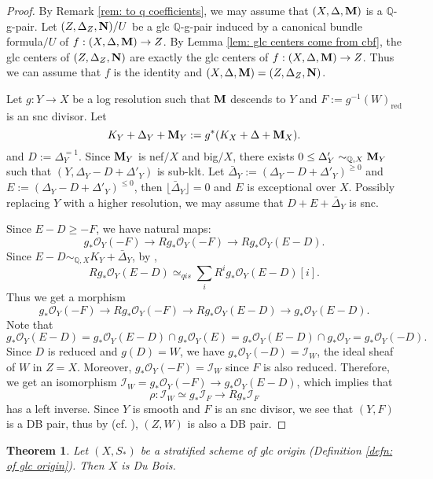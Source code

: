 \documentclass[11pt]{amsart}
\numberwithin{equation}{section}
\newcommand{\Mm}{{\bf{M}}}
\newcommand{\NN}{{\bf{N}}}
\newcommand{\Qq}{\mathbb{Q}}
\newcommand{\red}{\operatorname{red}}
\newcommand{\lf}{\lfloor}
\newcommand{\rf}{\rfloor}
\newcommand{\Oo}{\mathcal{O}}
\newtheorem{thm}{Theorem}[section]
\theoremstyle{definition}
\theoremstyle{definition}
\theoremstyle{definition}
\begin{document}
\begin{proof}
  By Remark \ref{rem: to q coefficients}, we may assume that
  $(X,\Delta,\Mm)$ is a $\Qq$-g-pair. Let $(Z,\Delta_Z,\NN)/U$ be a
  glc $\mathbb Q$-g-pair induced by a canonical bundle formula$/U$ of
  $f: (X,\Delta,\Mm)\rightarrow Z$. By Lemma \ref{lem: glc centers
  come from cbf}, the glc centers of $(Z,\Delta_Z,\NN)$ are exactly
  the glc centers of $f: (X,\Delta,\Mm)\rightarrow Z$. Thus we can
  assume that $f$ is the identity and $(X,\Delta,\Mm)=(Z,\Delta_Z,\NN)$.

  Let $g:Y\to X$ be a log resolution such that $\Mm$ descends to $Y$
  and $F:=g^{-1}(W)_{\red}$ is an snc divisor. Let
  $$
  K_Y+\Delta_Y+\Mm_Y:=g^*(K_X+\Delta+\Mm_X).
  $$
  and $D:=\Delta_Y^{=1}$. Since $\Mm_Y$ is nef$/X$ and big$/X$, there
  exists $0\le\Delta'_Y\sim_{\Qq,X}\Mm_Y$ such that
  $(Y,\Delta_Y-D+\Delta'_Y)$ is sub-klt. Let
  $\bar{\Delta}_Y:=(\Delta_Y-D+\Delta'_Y)^{\ge0}$ and
  $E:=(\Delta_Y-D+\Delta'_Y)^{\le 0}$, then $\lf\bar{\Delta}_Y\rf=0$
  and $E$ is exceptional over $X$. Possibly replacing $Y$ with a
  higher resolution, we may assume that $D+E+\bar{\Delta}_Y$ is snc.

  Since $E-D\ge-F$, we have natural maps:
  $$
  g_*\Oo_Y(-F)\to Rg_*\Oo_Y(-F)\to Rg_*\Oo_Y(E-D).
  $$
  Since $E-D\sim_{\Qq,X}K_Y+\bar{\Delta}_Y$, by \cite[Theorem 10.41]{Kol13},
  $$
  Rg_*\Oo_Y(E-D)\simeq_{qis}\sum_{i}R^ig_*\Oo_Y(E-D)[i].
  $$
  Thus we get a morphism
  $$
  g_*\Oo_Y(-F)\to Rg_*\Oo_Y(-F)\to Rg_*\Oo_Y(E-D)\to g_*\Oo_Y(E-D).
  $$
  Note that
  $$
  g_*\Oo_Y(E-D)=g_*\Oo_Y(E-D)\cap g_*\Oo_Y(E)=g_*\Oo_Y(E-D)\cap
  g_*\Oo_Y=g_*\Oo_Y(-D).
  $$
  Since $D$ is reduced and $g(D)=W$, we have
  $g_*\Oo_Y(-D)=\mathcal{I}_W$, the ideal sheaf of $W$ in $Z=X$.
  Moreover, $g_*\Oo_Y(-F)=\mathcal{I}_W$ since $F$ is also reduced.
  Therefore, we get an isomorphism $\mathcal{I}_W=g_*\Oo_Y(-F)\to
  g_*\Oo_Y(E-D)$, which implies that
  $$
  \rho: \mathcal{I}_W\simeq g_*\mathcal{I}_F\to Rg_*\mathcal{I}_F
  $$
  has a left inverse. Since $Y$ is smooth and $F$ is an snc divisor,
  we see that $(Y,F)$ is a DB pair, thus by \cite[Theorem 3.3]{Kov12}
  (cf. \cite[Theorem 6.27]{Kol13}), $(Z,W)$ is also a DB pair.
\end{proof}

\begin{thm}\label{thm: of glc origin implies DB}
  Let $(X,S_*)$ be a stratified scheme of glc origin (Definition
  \ref{defn: of glc origin}). Then $X$ is Du Bois.
\end{thm}
\end{document}
